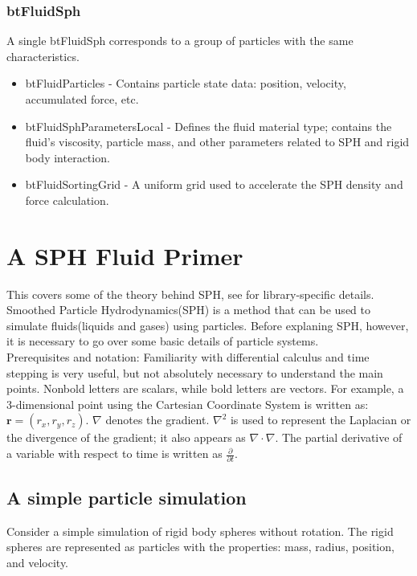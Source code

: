 \documentclass[]{article}
\begin{document}
		\subsubsection{btFluidSph}
			A single btFluidSph corresponds to a group of particles with the same characteristics.
			\begin{itemize}
				\item btFluidParticles - Contains particle state data: position, velocity, accumulated force, etc.
				\item btFluidSphParametersLocal - Defines the fluid material type; contains the fluid's viscosity, 
				particle mass, and other parameters related to SPH and rigid body interaction.
				\item btFluidSortingGrid - A uniform grid used to accelerate the SPH density and force calculation.
			\end{itemize}
			
\pagebreak
\section{A SPH Fluid Primer}
	
	This covers some of the theory behind SPH, see  for library-specific details.\\
	
	Smoothed Particle Hydrodynamics(SPH) is a method that can be used to simulate fluids(liquids and gases) using 
	particles. Before explaning SPH, however, it is necessary to go over some basic details of particle systems.\\
	
	Prerequisites and notation: Familiarity with differential calculus and time stepping is very useful, but not 
	absolutely necessary to understand the main points. Nonbold letters are scalars, while bold letters are vectors. 
	For example, a 3-dimensional point using the Cartesian Coordinate System is written as: 
	\( \mathbf{r} = (r_x, r_y, r_z) \). \( \nabla \) denotes the gradient. \(\nabla ^2\) is used to represent the 
	Laplacian or the divergence of the gradient; it also appears as \(\nabla \cdot \nabla\). The partial derivative of 
	a variable with respect to time is written as \( \frac{\partial}{\partial t} \).\\
	
	\subsection{A simple particle simulation}
	Consider a simple simulation of rigid body spheres without rotation. The rigid spheres are represented as particles
	with the properties: mass, radius, position, and velocity. 
	
\end{document}
